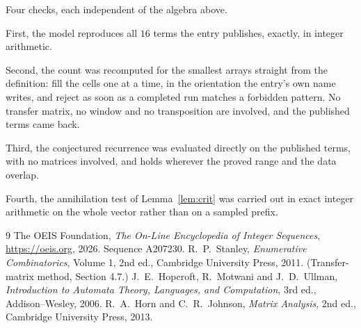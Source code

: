 \documentclass[11pt,a4paper]{article}
\theoremstyle{plain}
\theoremstyle{definition}
\begin{document}
Four checks, each independent of the algebra above.

First, the model reproduces all $16$ terms the entry publishes, exactly, in integer
arithmetic.

Second, the count was recomputed for the smallest arrays straight from the definition: fill the
cells one at a time, in the orientation the entry's own name writes, and reject as soon as a
completed run matches a forbidden pattern. No transfer matrix, no window and no transposition
are involved, and the published terms came back.

Third, the conjectured recurrence was evaluated directly on the published terms, with no
matrices involved, and holds wherever the proved range and the data overlap.

Fourth, the annihilation test of Lemma~\ref{lem:crit} was carried out in exact integer
arithmetic on the whole vector rather than on a sampled prefix.

\begin{thebibliography}{9}
 The OEIS Foundation, \emph{The On-Line Encyclopedia of Integer
Sequences}, \url{https://oeis.org}, 2026. Sequence A207230.
 R.~P.~Stanley, \emph{Enumerative Combinatorics}, Volume 1, 2nd ed.,
Cambridge University Press, 2011. (Transfer-matrix method, Section 4.7.)
 J.~E.~Hopcroft, R.~Motwani and J.~D.~Ullman, \emph{Introduction to Automata
Theory, Languages, and Computation}, 3rd ed., Addison--Wesley, 2006.
 R.~A.~Horn and C.~R.~Johnson, \emph{Matrix Analysis}, 2nd ed., Cambridge
University Press, 2013.
\end{thebibliography}
\end{document}
